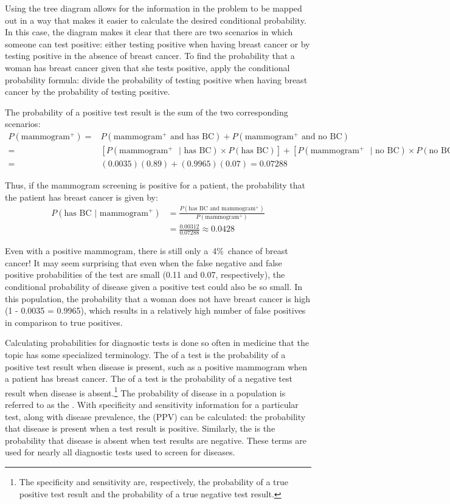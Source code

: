 Using the tree diagram allows for the information in the problem to be mapped out in a way that makes it easier to calculate the desired conditional probability. In this case, the diagram makes it clear that there are two scenarios in which someone can test positive: either testing positive when having breast cancer or by testing positive in the absence of breast cancer. To find the probability that a woman has breast cancer given that she tests positive, apply the conditional probability formula: divide the probability of testing positive when having breast cancer by the probability of testing positive.

The probability of a positive test result is the sum of the two corresponding scenarios:
\begin{align*}
P(\text{mammogram$^+$}) =&  P(\text{mammogram$^+$ and has BC}) + P(\text{mammogram$^+$ and no BC}) \\
=&[P(\text{mammogram$^+$ } | \text{ has BC}) \times P(\text{has BC})] + [P(\text{mammogram$^+$ } | \text{ no BC}) \times P(\text{no BC})] \\
=& (0.0035)(0.89) + (0.9965)(0.07) = 0.07288
\end{align*}

Thus, if the mammogram screening is positive for a patient, the probability that the patient has breast cancer is given by: 
\begin{align*}
P(\text{has BC } | \text{ mammogram$^+$})
	&= \frac{P(\text{has BC and mammogram$^+$})}{P(\text{mammogram$^+$})}\\
	&= \frac{0.00312}{0.07288} \approx 0.0428
\end{align*}

Even with a positive mammogram, there is still only a~4\%~chance of breast cancer! It may seem surprising that even when the false negative and false positive probabilities of the test are small (0.11 and 0.07, respectively), the conditional probability of disease given a positive test could also be so small. In this population, the probability that a woman does not have breast cancer is high (1 - 0.0035 = 0.9965), which results in a relatively high number of false positives in comparison to true positives.

Calculating probabilities for diagnostic tests is done so often in medicine that the topic has some specialized terminology. The  of a test is the probability of a positive test result when disease is present, such as a positive mammogram when a patient has breast cancer. The  of a test is the probability of a negative test result when disease is absent.\footnote{The specificity and sensitivity are, respectively, the probability of a true positive test result and the probability of a true negative test result.} The probability of disease in a population is referred to as the . With specificity and sensitivity information for a particular test, along with disease prevalence, the  (PPV) can be calculated: the probability that disease is present when a test result is positive. Similarly, the  is the probability that disease is absent when test results are negative. These terms are used for nearly all diagnostic tests used to screen for diseases.

